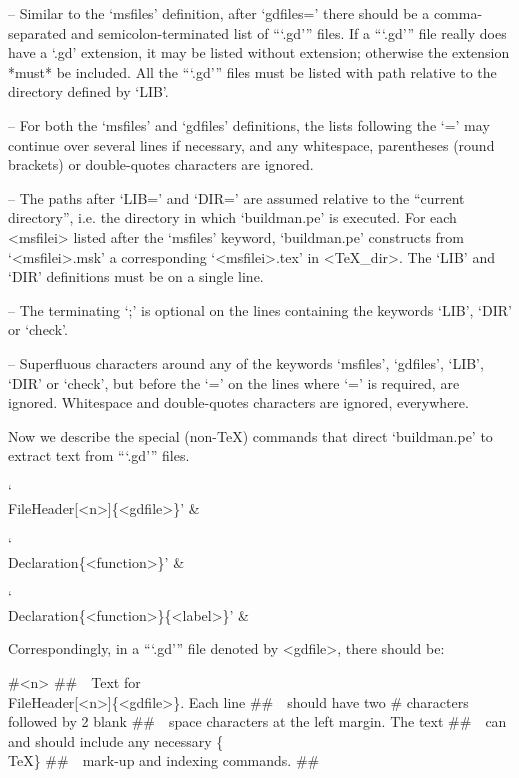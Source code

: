 \item{--}
Similar to the `msfiles' definition, after `gdfiles=' there should  be  a
comma-separated and semicolon-terminated list of ```.gd'''  files.  If  a
```.gd''' file really does have a  `.gd'  extension,  it  may  be  listed
without extension; otherwise the extension *must* be  included.  All  the
```.gd''' files must be  listed  with  path  relative  to  the  directory
defined by `LIB'.

\item{--}
For both the `msfiles' and `gdfiles' definitions, the lists following the
`=' may continue over several lines if  necessary,  and  any  whitespace,
parentheses (round brackets) or double-quotes characters are ignored.

\item{--}
The paths after `LIB=' and `DIR=' are assumed relative to  the  ``current
directory'', i.e. the directory in which `buildman.pe' is  executed.  For
each  <msfilei>  listed  after  the  `msfiles'   keyword,   `buildman.pe'
constructs  from  `<msfilei>.msk'  a  corresponding  `<msfilei>.tex'   in
<TeX_dir>. The `LIB' and `DIR' definitions must be on a single line.

\item{--}
The terminating `;' is optional on  the  lines  containing  the  keywords
`LIB', `DIR' or `check'.

\item{--}
Superfluous characters around any of the keywords  `msfiles',  `gdfiles',
`LIB', `DIR' or `check', but before the `=' on the  lines  where  `='  is
required,  are  ignored.  Whitespace  and  double-quotes  characters  are
ignored, everywhere.

\endlist

Now  we  describe  the  special   (non-{\TeX})   commands   that   direct
`buildman.pe' to extract text from ```.gd''' files.

\beginitems

`\\FileHeader[<n>]\{<gdfile>\}' &

`\\Declaration\{<function>\}' &

`\\Declaration\{<function>\}\{<label>\}' &

\enditems

Correspondingly, in a ```.gd''' file denoted by <gdfile>, there should be:

\)\#<n>
\)\#\#\ \ Text for \\FileHeader[<n>]\{<gdfile>\}. Each line
\)\#\#\ \ should have two \# characters followed by 2 blank
\)\#\#\ \ space characters at the left margin. The text
\)\#\#\ \ can and should include any necessary \{\\TeX\}
\)\#\#\ \ mark-up and indexing commands.
\)\#\#

